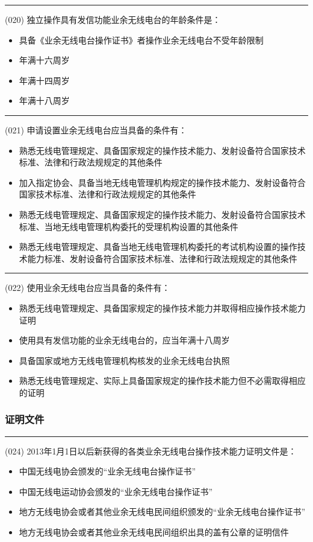 \documentclass[twocolumn,hyperref,UTF8]{ctexart}  %
\begin{document}
\noindent\rule{0.5\textwidth}{1pt}
\heiti (020) {\color{cyan}独立操作}具有发信功能业余无线电台的年龄条件是： \songti {\color{gray} [LK0027] }
\begin{itemize}
	\item  具备《业余无线电台操作证书》者操作业余无线电台不受年龄限制
	\item  年满十六周岁
	\item  年满十四周岁
	\item  年满十八周岁
\end{itemize}


\noindent\rule{0.5\textwidth}{1pt}
\heiti (021) {\color{cyan}申请设置}业余无线电台应当具备的条件有： \songti {\color{gray} [LK0041] }
\begin{itemize}
	\item  熟悉无线电管理规定、具备国家规定的操作技术能力、发射设备符合国家技术标准、法律和行政法规规定的其他条件
	\item  加入指定协会、具备当地无线电管理机构规定的操作技术能力、发射设备符合国家技术标准、法律和行政法规规定的其他条件
	\item  熟悉无线电管理规定、具备国家规定的操作技术能力、发射设备符合国家技术标准、当地无线电管理机构委托的受理机构设置的其他条件
	\item  熟悉无线电管理规定、具备当地无线电管理机构委托的考试机构设置的操作技术能力标准、发射设备符合国家技术标准、法律和行政法规规定的其他条件
\end{itemize}


\noindent\rule{0.5\textwidth}{1pt}
\heiti (022) {\color{cyan}使用}业余无线电台应当具备的条件有： \songti {\color{gray} [LK0042] }
\begin{itemize}
	\item  熟悉无线电管理规定、具备国家规定的操作技术能力并取得相应操作技术能力证明
	\item  使用具有发信功能的业余无线电台的，应当年满十八周岁
	\item  具备国家或地方无线电管理机构核发的业余无线电台执照
	\item  熟悉无线电管理规定、实际上具备国家规定的操作技术能力但不必需取得相应的证明
\end{itemize}


\subsubsection{证明文件}


\noindent\rule{0.5\textwidth}{1pt}
\heiti (024) 2013年1月1日以后新获得的各类业余无线电台{\color{cyan}操作技术能力证明文件}是： \songti {\color{gray} [LK0022] }
\begin{itemize}
	\item  中国无线电协会颁发的“业余无线电台操作证书”
	\item  中国无线电运动协会颁发的“业余无线电台操作证书”
	\item  地方无线电协会或者其他业余无线电民间组织颁发的“业余无线电台操作证书”
	\item  地方无线电协会或者其他业余无线电民间组织出具的盖有公章的证明信件
\end{itemize}
\end{document}
